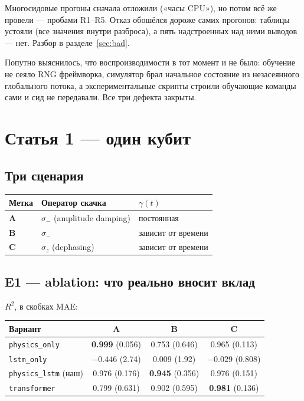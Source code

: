 \documentclass[12pt,a4paper]{article}
\newcommand{\code}[1]{\texttt{#1}}
\begin{document}
Многосидовые прогоны сначала отложили («часы CPU»), но потом всё же провели —
пробами R1–R5. Отказ обошёлся дороже самих прогонов: таблицы устояли (все
значения внутри разброса), а пять надстроенных над ними выводов — нет. Разбор
в разделе~\ref{sec:bad}.

Попутно выяснилось, что воспроизводимости в тот момент и не было: обучение не
сеяло RNG фреймворка, симулятор брал начальное состояние из незасеянного
глобального потока, а экспериментальные скрипты строили обучающие команды сами
и сид не передавали. Все три дефекта закрыты.

\section{Статья 1 — один кубит}

\subsection{Три сценария}

\begin{center}
\begin{tabular}{@{}lll@{}}
\toprule
Метка & Оператор скачка & $\gamma(t)$ \\
\midrule
\textbf{A} & $\sigma_-$ (amplitude damping) & постоянная \\
\textbf{B} & $\sigma_-$ & зависит от времени \\
\textbf{C} & $\sigma_z$ (dephasing) & зависит от времени \\
\bottomrule
\end{tabular}
\end{center}

\subsection{E1 — ablation: что реально вносит вклад}

$R^2$, в скобках MAE:

\begin{center}
\begin{tabular}{@{}lccc@{}}
\toprule
Вариант & A & B & C \\
\midrule
\code{physics\_only} & \textbf{0.999} (0.056) & 0.753 (0.646) & 0.965 (0.113) \\
\code{lstm\_only} & $-0.446$ (2.74) & 0.009 (1.92) & $-0.029$ (0.808) \\
\code{physics\_lstm} (наш) & 0.976 (0.176) & \textbf{0.945} (0.356) & 0.976 (0.151) \\
\code{transformer} & 0.799 (0.631) & 0.902 (0.595) & \textbf{0.981} (0.136) \\
\bottomrule
\end{tabular}
\end{center}
\end{document}
